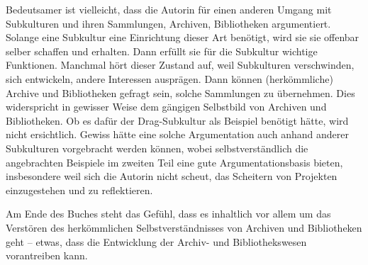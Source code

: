 \documentclass[a4paper,
fontsize=11pt,
oneside,
numbers=noperiodatend,
parskip=half-,
bibliography=totoc,
final
]{scrartcl}
\begin{document}
Bedeutsamer ist vielleicht, dass die Autorin für einen anderen Umgang
mit Subkulturen und ihren Sammlungen, Archiven, Bibliotheken
argumentiert. Solange eine Subkultur eine Einrichtung dieser Art
benötigt, wird sie sie offenbar selber schaffen und erhalten. Dann
erfüllt sie für die Subkultur wichtige Funktionen. Manchmal hört dieser
Zustand auf, weil Subkulturen verschwinden, sich entwickeln, andere
Interessen ausprägen. Dann können (herkömmliche) Archive und
Bibliotheken gefragt sein, solche Sammlungen zu übernehmen. Dies
widerspricht in gewisser Weise dem gängigen Selbstbild von Archiven und
Bibliotheken. Ob es dafür der Drag-Subkultur als Beispiel benötigt
hätte, wird nicht ersichtlich. Gewiss hätte eine solche Argumentation
auch anhand anderer Subkulturen vorgebracht werden können, wobei
selbstverständlich die angebrachten Beispiele im zweiten Teil eine gute
Argumentationsbasis bieten, insbesondere weil sich die Autorin nicht
scheut, das Scheitern von Projekten einzugestehen und zu reflektieren.

Am Ende des Buches steht das Gefühl, dass es inhaltlich vor allem um das
Verstören des herkömmlichen Selbstverständnisses von Archiven und
Bibliotheken geht -- etwas, dass die Entwicklung der Archiv- und
Bibliothekswesen vorantreiben kann.

\end{document}
